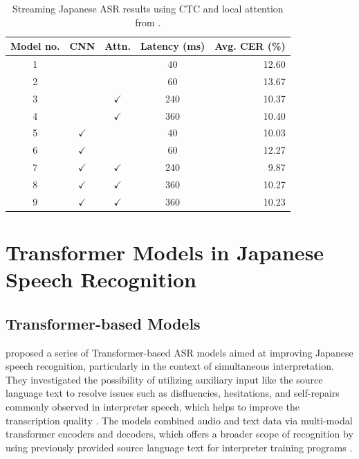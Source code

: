 \begin{table}[H]
\centering
\caption{Streaming Japanese ASR results using CTC and local attention from \cite{chen2020streaming}.}
\label{tab:chen2020_streaming_avgcer_latency}
{\small
\setlength{\tabcolsep}{7pt}
\renewcommand{\arraystretch}{1.15}
\begin{tabular}{c c c c r}
\hline
\textbf{Model no.} & \textbf{CNN} & \textbf{Attn.} & \textbf{Latency (ms)} & \textbf{Avg. CER (\%)} \\
\hline
1 &  &  &  40  & 12.60 \\
2 &  &  &  60  & 13.67 \\
3 &  & $\checkmark$ & 240  & 10.37 \\
4 &  & $\checkmark$ & 360  & 10.40 \\
5 & $\checkmark$ &  &  40  & 10.03 \\
6 & $\checkmark$ &  &  60  & 12.27 \\
7 & $\checkmark$ & $\checkmark$ & 240  &  9.87 \\
8 & $\checkmark$ & $\checkmark$ & 360  & 10.27 \\
9 & $\checkmark$ & $\checkmark$ & 360  & 10.23 \\
\hline
\end{tabular}}
\end{table}

\section{Transformer Models in Japanese Speech Recognition}
\subsection{Transformer-based Models}
\textcite{taniguchi2022transformer} proposed a series of Transformer-based ASR models aimed at improving Japanese speech recognition, particularly in the context of simultaneous interpretation. They investigated the possibility of utilizing auxiliary input like the source language text to resolve issues such as disfluencies, hesitations, and self-repairs commonly observed in interpreter speech, which helps to improve the transcription quality \parencite{Futami2020Bidirectional}. The models combined audio and text data via multi-modal transformer encoders and decoders, which offers a broader scope of recognition by using previously provided source language text for interpreter training programs \parencite{taniguchi2022transformer}.


